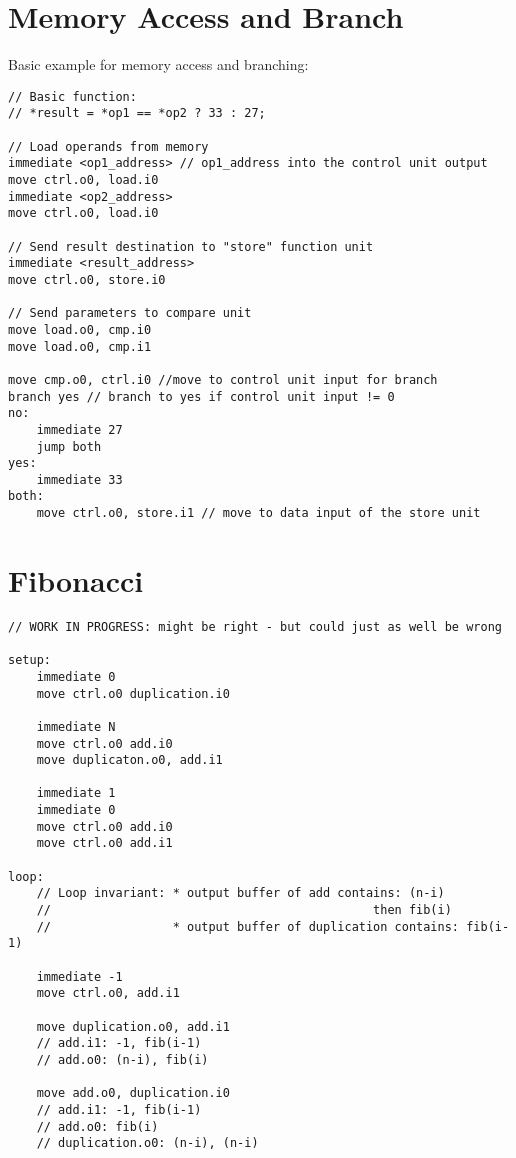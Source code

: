 \documentclass[adraft]{eptcs}
\begin{document}
	\newpage
	\begin{appendices}
		\newpage
		\section{Memory Access and Branch}
			\label{app:ex1}
			
			Basic example for memory access and branching:
			
			\begin{lstlisting}
// Basic function:
// *result = *op1 == *op2 ? 33 : 27;

// Load operands from memory
immediate <op1_address> // op1_address into the control unit output
move ctrl.o0, load.i0
immediate <op2_address>
move ctrl.o0, load.i0

// Send result destination to "store" function unit
immediate <result_address>
move ctrl.o0, store.i0

// Send parameters to compare unit
move load.o0, cmp.i0
move load.o0, cmp.i1

move cmp.o0, ctrl.i0 //move to control unit input for branch
branch yes // branch to yes if control unit input != 0
no:
	immediate 27
	jump both
yes:
	immediate 33
both:
	move ctrl.o0, store.i1 // move to data input of the store unit
			\end{lstlisting}
		
		\newpage
		\section{Fibonacci}
			\label{app:fib}
			
			\begin{lstlisting}
// WORK IN PROGRESS: might be right - but could just as well be wrong

setup:
	immediate 0
	move ctrl.o0 duplication.i0
	
	immediate N
	move ctrl.o0 add.i0
	move duplicaton.o0, add.i1
	
	immediate 1
	immediate 0
	move ctrl.o0 add.i0
	move ctrl.o0 add.i1

loop:
	// Loop invariant: * output buffer of add contains: (n-i)
	//                                             then fib(i)
	//                 * output buffer of duplication contains: fib(i-1)
	
	immediate -1
	move ctrl.o0, add.i1
	
	move duplication.o0, add.i1
	// add.i1: -1, fib(i-1)
	// add.o0: (n-i), fib(i)
	
	move add.o0, duplication.i0
	// add.i1: -1, fib(i-1)
	// add.o0: fib(i)
	// duplication.o0: (n-i), (n-i)
	

\end{lstlisting}
\end{appendices}
\end{document}
